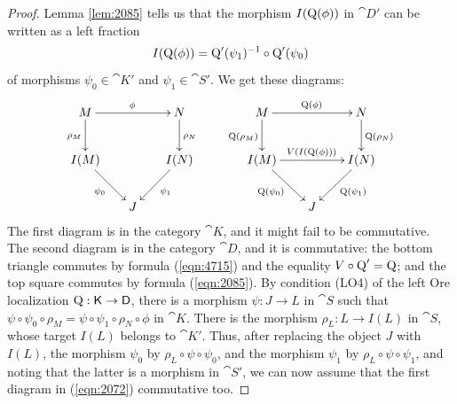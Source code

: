 \begin{proof}
Lemma \ref{lem:2085} tells us that the morphism $I(\operatorname{Q}(\phi))$ in 
$\cat{D}'$ can be written as a left fraction
\begin{equation} \label{eqn:4715}
I(\operatorname{Q}(\phi)) = \operatorname{Q}'(\psi_1)^{-1} \circ \operatorname{Q}'(\psi_0)
\end{equation}
of morphisms $\psi_0 \in \cat{K}'$ and $\psi_1 \in \cat{S}'$. 
We get these diagrams: 
\begin{equation} \label{eqn:2072}
\UseTips \xymatrix @C=4ex @R=5.5ex {
M
\ar[rr]^{\phi}
\ar[d]_{\rho_M}
&
&
N
\ar[d]^{\rho_N}
\\
I(M)
\ar[dr]_{\psi_0}
&
&
I(N)
\ar[dl]^{\psi_1}
\\
&
J
} 
\quad \quad 
\UseTips \xymatrix @C=4,5ex @R=5.5ex {
M
\ar[rr]^{\opn{Q}(\phi)}
\ar[d]_{\opn{Q}(\rho_M)}
&
&
N
\ar[d]^{\opn{Q}(\rho_N)}
\\
I(M)
\ar[rr]^{ V(I(\opn{Q}(\phi))) }
\ar[dr]_{\opn{Q}(\psi_0)}
&
&
I(N)
\ar[dl]^{\opn{Q}(\psi_1)}
\\
&
J
} 
\end{equation}
The first diagram is in the category $\cat{K}$, and it might fail to be 
commutative. The second diagram is in the category $\cat{D}$, and it is 
commutative: the bottom triangle commutes by formula (\ref{eqn:4715}) and the 
equality $V \circ \operatorname{Q}' = \operatorname{Q}$; and the top square commutes by 
formula (\ref{eqn:2085}). By condition (LO4) of the left Ore localization 
$\operatorname{Q} : \operatorname{\mathsf{K}} \to \operatorname{\mathsf{D}}$, there is a morphism 
$\psi : J \to L$ in $\cat{S}$ such that 
$\psi \circ \psi_0 \circ \rho_M = \psi \circ \psi_1 \circ \rho_N \circ \phi$
in $\cat{K}$. There is the morphism 
$\rho_L : L \to I(L)$ in $\cat{S}$, whose target $I(L)$ belongs to $\cat{K}'$. 
Thus, after replacing the object $J$ with $I(L)$, the morphism 
$\psi_0$ by $\rho_L \circ \psi \circ \psi_0$, and the morphism 
$\psi_1$ by $\rho_L \circ \psi \circ \psi_1$, and noting that the latter is a 
morphism in $\cat{S}'$, we can now assume that the first diagram in 
(\ref{eqn:2072}) commutative too.


\end{proof}
